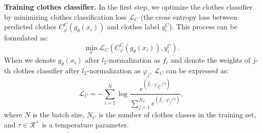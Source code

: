 \documentclass[10pt,twocolumn,letterpaper]{article}
\begin{document}
\medskip
\noindent
\textbf{Training clothes classifier.} In the first step, we optimize the clothes classifier by minimizing clothes classification loss $\mathcal{L}_{C}$ (the cross entropy loss between predicted clothes $C^{C}_{\varphi}(g_{\theta}(x_i))$ and clothes label $y^{C}_i$).
This process can be formulated as:
\begin{equation}\label{eq:firststep}
	\min_{\varphi} \mathcal{L}_{C}(C^{C}_{\varphi}(g_{\theta}(x_i)), y^{C}_i).
\end{equation}
When we denote $g_{\theta}(x_i)$ after $l_2$-normalization as $f_i$ and denote the weights of $j$-th clothes classifier after $l_2$-normalization as ${\varphi}_j$, $\mathcal{L}_{C}$ can be expressed as:
\begin{equation}\label{eq:clothloss}
	\mathcal{L}_{C}=-\sum\limits_{i=1}^N \log \frac{ e^{(f_i\cdot \varphi_{y_i^C} /\tau)}}{\sum\limits_{j=1}^{N_C} e^{(f_i\cdot \varphi_j /\tau)}},
\end{equation}
where $N$ is the batch size, $N_C$ is the number of clothes classes in the training set, and $\tau \in \mathcal{R}^+$ is a temperature parameter.
\end{document}
